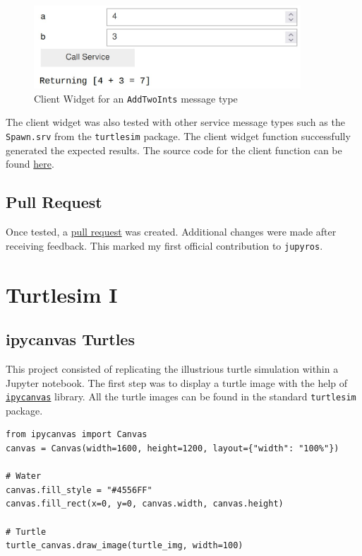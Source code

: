         \begin{figure}[hb]
            \centering
            \includegraphics[width=10cm]{Images/01_clientWidget.jpg}
            \caption{Client Widget for an \texttt{AddTwoInts} message type}
            \label{fig:client}
        \end{figure}
    
        \noindent The client widget was also tested with other service message types such as the \texttt{Spawn.srv} from the \texttt{turtlesim} package. The client widget function successfully generated the expected results. The source code for the client function can be found \href{https://github.com/RoboStack/jupyter-ros/blob/master/jupyros/ros_widgets.py}{here}.
    
    \subsection{Pull Request}
    
        Once tested, a \href{https://github.com/RoboStack/jupyter-ros/pull/92}{pull request} was created. Additional changes were made after receiving feedback. This marked my first official contribution to \texttt{jupyros}.
        

\section{Turtlesim I}

    \subsection{ipycanvas Turtles}
        
        This project consisted of replicating the illustrious turtle simulation within a Jupyter notebook. The first step was to display a turtle image with the help of \href{https://ipycanvas.readthedocs.io/en/latest/index.html}{\texttt{ipycanvas}} library. All the turtle images can be found in the standard \texttt{turtlesim} package. 
        
        \begin{lstlisting}
from ipycanvas import Canvas
canvas = Canvas(width=1600, height=1200, layout={"width": "100%"})

# Water
canvas.fill_style = "#4556FF"
canvas.fill_rect(x=0, y=0, canvas.width, canvas.height)

# Turtle
turtle_canvas.draw_image(turtle_img, width=100)
        \end{lstlisting}
    
